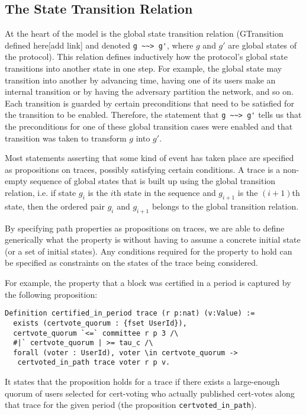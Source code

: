\subsection{The State Transition Relation}
At the heart of the model is the global state transition relation (GTransition defined here[add link] and denoted \lstinline{g ~~> g'}, where $g$ and $g'$ are global states of the protocol). This relation defines inductively how the protocol's global state transitions into another state in one step. For example, the global state may transition into another by advancing time, having one of its users make an internal transition or by having the adversary partition the network, and so on. Each transition is guarded by certain preconditions that need to be satisfied for the transition to be enabled. Therefore, the statement that \lstinline{g ~~> g'} tells us that the preconditions for one of these global transition cases were enabled and that transition was taken to transform $g$ into $g'$.

Most statements asserting that some kind of event has taken place are specified as propositions on traces, possibly satisfying certain conditions. A trace is a non-empty sequence of global states that is built up using the global transition relation, i.e. if state $g_i$ is the $i$th state in the sequence and $g_{i+1}$ is the $(i+1)$th state, then the ordered pair $g_i$ and $g_{i+1}$ belongs to the global transition relation. 

By specifying path properties as propositions on traces, we are able to define generically what the property is without having to assume a concrete initial state (or a set of initial states). Any conditions required for the property to hold can be specified as constraints on the states of the trace being considered.

For example, the property that a block was certified in a period is captured by the following proposition:
\begin{lstlisting}[language=Coq]
Definition certified_in_period trace (r p:nat) (v:Value) :=
  exists (certvote_quorum : {fset UserId}),
  certvote_quorum `<=` committee r p 3 /\
  #|` certvote_quorum | >= tau_c /\
  forall (voter : UserId), voter \in certvote_quorum ->
   certvoted_in_path trace voter r p v.
\end{lstlisting}
It states that the proposition holds for a trace if there exists a large-enough quorum of users selected for cert-voting who actually published cert-votes along that trace for the given period (the proposition \lstinline{certvoted_in_path}).

